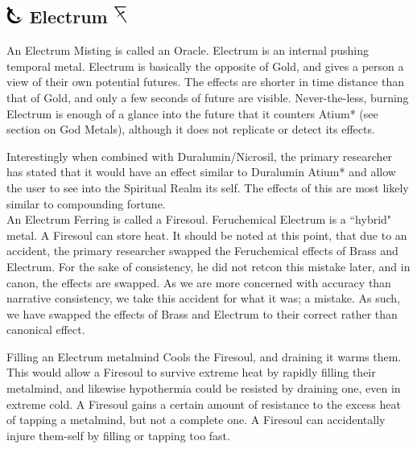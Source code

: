\documentclass[conference]{IEEEtran}
\begin{document}
\subsection*{\includegraphics[height=1em]{images/Electrum.png}  Electrum \includegraphics[height=1em]{images/Electrum_(Feruchemy).png}}
An Electrum Misting is called an Oracle.\cite{ARS}  Electrum is an internal pushing temporal metal.\cite{AL-TB}  Electrum is basically the opposite of Gold, and gives a person a view of their own potential futures.\cite{ARS}  The effects are shorter in time distance than that of Gold, and only a few seconds of future are visible.  Never-the-less, burning Electrum is enough of a glance into the future that it counters Atium*\cite{HoA-CH3} (see section on God Metals), although it does not replicate or detect its effects.\cite{HoA-CH5}

Interestingly when combined with Duralumin/Nicrosil, the primary researcher has stated that it would have an effect similar to Duralumin Atium*\cite{HoA-CH81} and allow the user to see into the Spiritual Realm its self.\cite{enhanced-nicrosil}  The effects of this are most likely similar to compounding fortune.\\

An Electrum Ferring is called a Firesoul.\cite{ARS}  Feruchemical Electrum is a ``hybrid" metal.\cite{FE-TB}  A Firesoul can store heat.\cite{ARS}  It should be noted at this point, that due to an accident, the primary researcher swapped the Feruchemical effects of Brass and Electrum.   For the sake of consistency, he did not retcon this mistake later, and in canon, the effects are swapped.  As we are more concerned with accuracy than narrative consistency, we take this accident for what it was; a mistake.\cite{mistake}\cite{unreliability}  As such, we have swapped the effects of Brass and Electrum to their correct rather than canonical effect.  

Filling an Electrum metalmind Cools the Firesoul, and draining it warms them.  This would allow a Firesoul to survive extreme heat by rapidly filling their metalmind,\cite{fire-res} and likewise hypothermia could be resisted by draining one, even in extreme cold.\cite{BoM-CH24}  A Firesoul gains a certain amount of resistance to the excess heat of tapping a metalmind, but not a complete one.\cite{fire-res}  A Firesoul can accidentally injure them-self by filling or tapping too fast.\cite{fire-pound}\\
\end{document}
